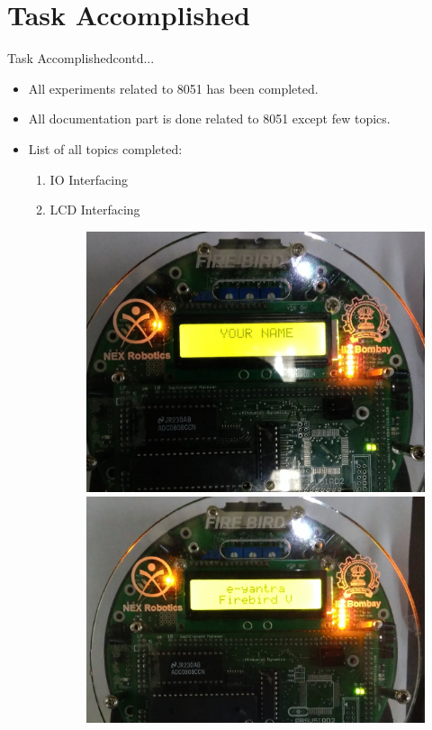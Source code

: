 \documentclass[10pt, a4paper]{beamer}
\begin{document}
\section{Task Accomplished}
\begin{frame}{Task Accomplished}{contd...}
	\begin{itemize}
		\item All experiments related to 8051 has been completed.
		\item All documentation part is done related to 8051 except few topics.
		\item List of all topics completed:
		\begin{enumerate}
			\item IO Interfacing  			
			\item LCD Interfacing 
			\begin{figure}[h]
					\includegraphics[scale=0.15]{lcd3.jpg}\\
					\includegraphics[scale=0.15]{lcd2.jpg}\\ \vspace{0.5cm}

\end{figure}
\end{enumerate}
\end{itemize}
\end{frame}
\end{document}
